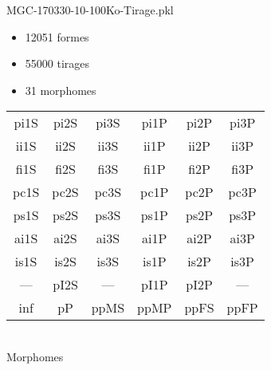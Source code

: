 MGC-170330-10-100Ko-Tirage.pkl
\begin{itemize}
\item 12051 formes
\item 55000 tirages
\item 31 morphomes
\end{itemize}
\begin{center}
\begin{tabular}{cccccc}
\hline
\cellcolor{white}pi1S & \cellcolor{orange}pi2S & \cellcolor{orange}pi3S & \cellcolor{white}pi1P & \cellcolor{white}pi2P & \cellcolor{white}pi3P\\
\cellcolor{brown}ii1S & \cellcolor{brown}ii2S & \cellcolor{brown}ii3S & \cellcolor{white}ii1P & \cellcolor{white}ii2P & \cellcolor{brown}ii3P\\
\cellcolor{yellow}fi1S & \cellcolor{lime}fi2S & \cellcolor{lime}fi3S & \cellcolor{green}fi1P & \cellcolor{white}fi2P & \cellcolor{green}fi3P\\
\cellcolor{yellow}pc1S & \cellcolor{yellow}pc2S & \cellcolor{yellow}pc3S & \cellcolor{white}pc1P & \cellcolor{white}pc2P & \cellcolor{yellow}pc3P\\
\cellcolor{teal}ps1S & \cellcolor{white}ps2S & \cellcolor{teal}ps3S & \cellcolor{white}ps1P & \cellcolor{white}ps2P & \cellcolor{teal}ps3P\\
\cellcolor{white}ai1S & \cellcolor{lightgray}ai2S & \cellcolor{lightgray}ai3S & \cellcolor{white}ai1P & \cellcolor{pink}ai2P & \cellcolor{white}ai3P\\
\cellcolor{pink}is1S & \cellcolor{pink}is2S & \cellcolor{lightgray}is3S & \cellcolor{pink}is1P & \cellcolor{black}is2P & \cellcolor{pink}is3P\\
--- & \cellcolor{white}pI2S & --- & \cellcolor{white}pI1P & \cellcolor{white}pI2P & ---\\
\cellcolor{white}inf & \cellcolor{white}pP & \cellcolor{white}ppMS & \cellcolor{white}ppMP & \cellcolor{white}ppFS & \cellcolor{pink}ppFP\\
\hline
\end{tabular}\\
Morphomes
\end{center}
\bigskip

